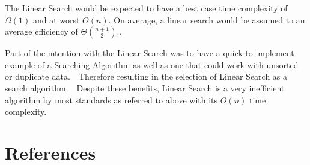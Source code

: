 \documentclass[11pt]{article} %
\begin{document}
The Linear Search would be expected to have a best case time complexity of $\Omega(1)$ and at worst $O(n)$. On average, a linear search would be assumed to an average efficiency of $\Theta(\frac{n+1}{2})$.\autocite[1]{noauthor_linear_2022}.~~\par
Part of the intention with the Linear Search was to have a quick to implement example of a Searching Algorithm as well as one that could work with unsorted or duplicate data.~~Therefore resulting in the selection of Linear Search as a search algorithm.~~Despite these benefits, Linear Search is a very inefficient algorithm by most standards as referred to above with its $O(n)$ time complexity.~~\par


\newpage
\section{References}

\printbibliography
\end{document}
